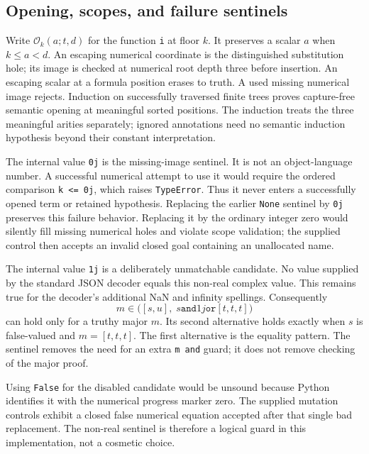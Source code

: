 \documentclass[11pt,letterpaper]{article}
\theoremstyle{definition}\newtheorem{definition}[theorem]{Definition}
\theoremstyle{remark}\newtheorem{remark}[theorem]{Remark}
\begin{document}
\subsection{Opening, scopes, and failure sentinels}

Write $\mathcal O_k(a;t,d)$ for the function \texttt{i} at floor $k$.
It preserves a scalar $a$ when $k\leq a<d$. An escaping numerical
coordinate is the distinguished substitution hole; its image is checked
at numerical root depth three before insertion. An escaping scalar at
a formula position erases to truth. A used missing numerical image
rejects. Induction on successfully traversed finite trees proves
capture-free semantic opening at meaningful sorted positions. The
induction treats the three meaningful arities separately; ignored
annotations need no semantic induction hypothesis beyond their constant
interpretation.

The internal value \texttt{0j} is the missing-image sentinel. It is not
an object-language number. A successful numerical attempt to use it
would require the ordered comparison \texttt{k <= 0j}, which raises
\texttt{TypeError}. Thus it never enters a successfully opened term or
retained hypothesis. Replacing the earlier \texttt{None} sentinel by
\texttt{0j} preserves this failure behavior. Replacing it by the ordinary
integer zero would silently fill missing numerical holes and violate
scope validation; the supplied control then accepts an invalid closed
goal containing an unallocated name.

The internal value \texttt{1j} is a deliberately unmatchable candidate.
No value supplied by the standard JSON decoder equals this non-real
complex value. This remains true for the decoder's additional NaN and
infinity spellings. Consequently
\[
 m\in\bigl([s,u],\;s\mathbin{\texttt{and}}1j
                       \mathbin{\texttt{or}}[t,t,t]\bigr)
\]
can hold only for a truthy major $m$. Its second alternative holds
exactly when $s$ is false-valued and $m=[t,t,t]$. The first alternative
is the equality pattern. The sentinel removes the need for an extra
\texttt{m and} guard; it does not remove checking of the major proof.

Using \texttt{False} for the disabled candidate would be unsound because
Python identifies it with the numerical progress marker zero. The
supplied mutation controls exhibit a closed false numerical equation
accepted after that single bad replacement. The non-real sentinel is
therefore a logical guard in this implementation, not a cosmetic choice.
\end{document}
